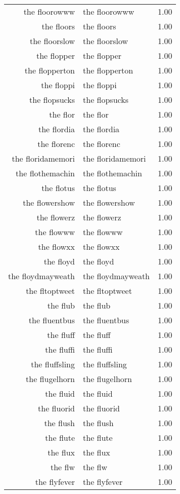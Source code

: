 \begin{table}[ht]
\begin{tabular}{rlr}
  the floorowww & the floorowww & 1.00 \\ 
  the floors & the floors & 1.00 \\ 
  the floorslow & the floorslow & 1.00 \\ 
  the flopper & the flopper & 1.00 \\ 
  the flopperton & the flopperton & 1.00 \\ 
  the floppi & the floppi & 1.00 \\ 
  the flopsucks & the flopsucks & 1.00 \\ 
  the flor & the flor & 1.00 \\ 
  the flordia & the flordia & 1.00 \\ 
  the florenc & the florenc & 1.00 \\ 
  the floridamemori & the floridamemori & 1.00 \\ 
  the flothemachin & the flothemachin & 1.00 \\ 
  the flotus & the flotus & 1.00 \\ 
  the flowershow & the flowershow & 1.00 \\ 
  the flowerz & the flowerz & 1.00 \\ 
  the flowww & the flowww & 1.00 \\ 
  the flowxx & the flowxx & 1.00 \\ 
  the floyd & the floyd & 1.00 \\ 
  the floydmayweath & the floydmayweath & 1.00 \\ 
  the fltoptweet & the fltoptweet & 1.00 \\ 
  the flub & the flub & 1.00 \\ 
  the fluentbus & the fluentbus & 1.00 \\ 
  the fluff & the fluff & 1.00 \\ 
  the fluffi & the fluffi & 1.00 \\ 
  the fluffsling & the fluffsling & 1.00 \\ 
  the flugelhorn & the flugelhorn & 1.00 \\ 
  the fluid & the fluid & 1.00 \\ 
  the fluorid & the fluorid & 1.00 \\ 
  the flush & the flush & 1.00 \\ 
  the flute & the flute & 1.00 \\ 
  the flux & the flux & 1.00 \\ 
  the flw & the flw & 1.00 \\ 
  the flyfever & the flyfever & 1.00 \\ 

\end{tabular}
\end{table}
